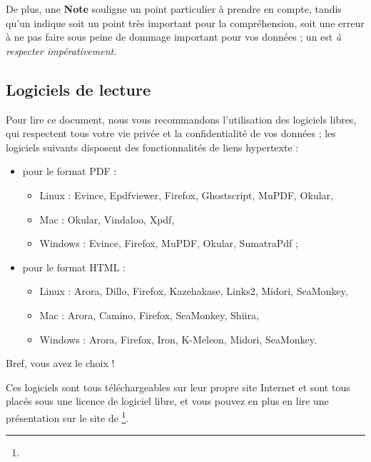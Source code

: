De plus, une \textbf{Note} souligne un point particulier à prendre en compte, tandis qu'un  indique soit un point très important pour la compréhension, soit une erreur à ne pas faire sous peine de dommage important pour vos données ; un  est \emph{à respecter impérativement}.


\subsection{Logiciels de lecture\label{introduction-manual-readers}}

Pour lire ce document, nous vous recommandons l'utilisation des logiciels libres, qui respectent tous votre vie privée et la confidentialité de vos données ; les logiciels suivants disposent des fonctionnalités de \gls{liens hypertexte} : 
\begin{itemize}
	\item pour le format PDF : 
		\begin{itemize}
				\item Linux : Evince, Epdfviewer, Firefox, Ghostscript, MuPDF, Okular,
				\item Mac : Okular, Vindaloo, Xpdf,
				\item Windows : Evince, Firefox, MuPDF, Okular, SumatraPdf ;
		\end{itemize}
	\item pour le format HTML :
		\begin{itemize}
				\item Linux : Arora, Dillo, Firefox, Kazehakase, Links2, Midori, SeaMonkey,
				\item Mac : Arora, Camino, Firefox, SeaMonkey, Shiira,
				\item Windows : Arora, Firefox, Iron, K-Meleon, Midori, SeaMonkey.
		\end{itemize}
\end{itemize}

Bref, vous avez le choix !

Ces logiciels sont tous téléchargeables sur leur propre site Internet et sont tous placés sous une licence de \gls{logiciel libre}, et vous pouvez en plus en lire une présentation sur le site de \footnote{\urlFramasoftLogiciels{}}.